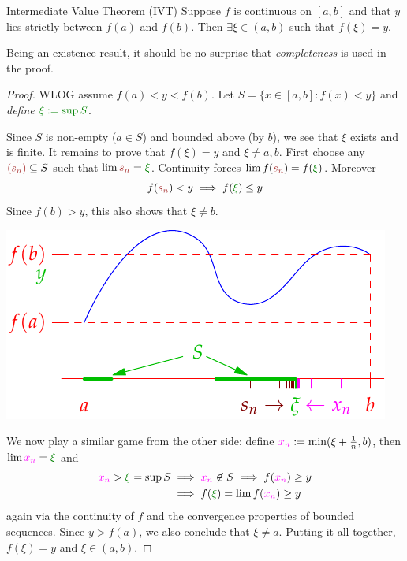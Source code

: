 \begin{thm}{Intermediate Value Theorem (IVT)}{}
	Suppose $f$ is continuous on $[a,b]$ and that $y$ lies strictly between $f(a)$ and $f(b)$. Then $\exists\xi\in(a,b)$ such that $f(\xi)=y$.
\end{thm}

Being an existence result, it should be no surprise that \emph{completeness} is used in the proof.

\begin{proof}
	WLOG assume $f(a)<y<f(b)$. Let $S=\bigl\{x\in[a,b]:f(x)<y\bigr\}$ and \emph{define} $\textcolor{Green}{\xi:=\sup S}$.\par
	\begin{minipage}[t]{0.52\linewidth}\vspace{-5pt}
		Since $S$ is non-empty ($a\in S$) and bounded above (by $b$), we see that $\xi$ exists and is finite. It remains to prove that $f(\xi)=y$ and $\xi\neq a,b$.\smallbreak
		First choose any $\textcolor{Brown}{(s_n)}\subseteq S$ such that $\lim\textcolor{Brown}{s_n}=\textcolor{Green}{\xi}$.
		Continuity forces $\lim f(\textcolor{Brown}{s_n})=f(\textcolor{Green}{\xi})$. Moreover
		\[
			f(\textcolor{Brown}{s_n})< y\implies f(\textcolor{Green}{\xi})\le y
		\]
		Since $f(b)>y$, this also shows that $\xi\neq b$.
	\end{minipage}
	\hfill
	\begin{minipage}[t]{0.46\linewidth}\vspace{0pt}
		\hfill\includegraphics[scale=0.95]{intval}
	\end{minipage}
	\smallbreak
	We now play a similar game from the other side: define $\textcolor{Magenta}{x_n}:=\min(\xi+\frac 1n,b)$, then $\lim\textcolor{Magenta}{x_n}=\textcolor{Green}{\xi}$ and
  \begin{align*}
  	\textcolor{Magenta}{x_n}>\textcolor{Green}{\xi}=\sup S
  	&\implies \textcolor{Magenta}{x_n}\not\in S
  		\implies f(\textcolor{Magenta}{x_n})\ge y\\
  	&\implies f(\textcolor{Green}{\xi})=\lim f(\textcolor{Magenta}{x_n})\ge y
  \end{align*}
  again via the continuity of $f$ and the convergence properties of bounded sequences. Since $y>f(a)$, we also conclude that $\xi\neq a$.\smallbreak
  Putting it all together, $f(\xi)=y$ and $\xi\in(a,b)$.
\end{proof}


